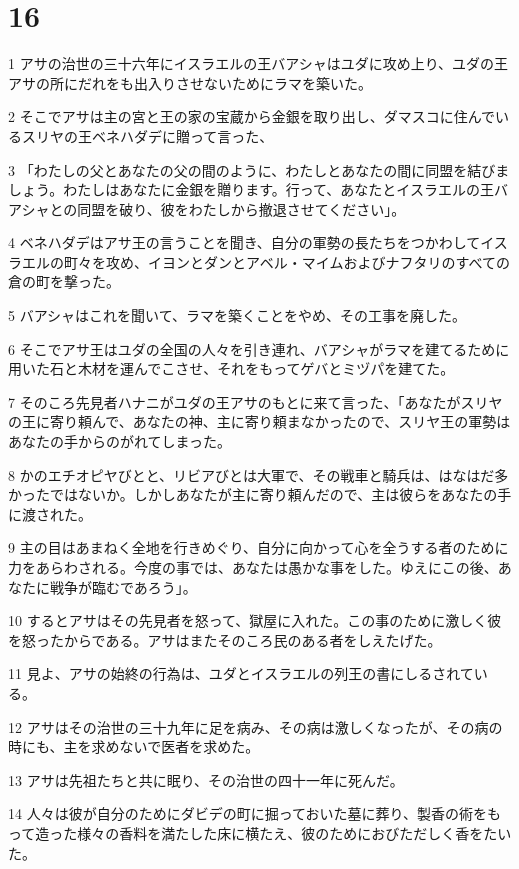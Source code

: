 \chapter{16}

\par 1 アサの治世の三十六年にイスラエルの王バアシャはユダに攻め上り、ユダの王アサの所にだれをも出入りさせないためにラマを築いた。
\par 2 そこでアサは主の宮と王の家の宝蔵から金銀を取り出し、ダマスコに住んでいるスリヤの王ベネハダデに贈って言った、
\par 3 「わたしの父とあなたの父の間のように、わたしとあなたの間に同盟を結びましょう。わたしはあなたに金銀を贈ります。行って、あなたとイスラエルの王バアシャとの同盟を破り、彼をわたしから撤退させてください」。
\par 4 ベネハダデはアサ王の言うことを聞き、自分の軍勢の長たちをつかわしてイスラエルの町々を攻め、イヨンとダンとアベル・マイムおよびナフタリのすべての倉の町を撃った。
\par 5 バアシャはこれを聞いて、ラマを築くことをやめ、その工事を廃した。
\par 6 そこでアサ王はユダの全国の人々を引き連れ、バアシャがラマを建てるために用いた石と木材を運んでこさせ、それをもってゲバとミヅパを建てた。
\par 7 そのころ先見者ハナニがユダの王アサのもとに来て言った、「あなたがスリヤの王に寄り頼んで、あなたの神、主に寄り頼まなかったので、スリヤ王の軍勢はあなたの手からのがれてしまった。
\par 8 かのエチオピヤびとと、リビアびとは大軍で、その戦車と騎兵は、はなはだ多かったではないか。しかしあなたが主に寄り頼んだので、主は彼らをあなたの手に渡された。
\par 9 主の目はあまねく全地を行きめぐり、自分に向かって心を全うする者のために力をあらわされる。今度の事では、あなたは愚かな事をした。ゆえにこの後、あなたに戦争が臨むであろう」。
\par 10 するとアサはその先見者を怒って、獄屋に入れた。この事のために激しく彼を怒ったからである。アサはまたそのころ民のある者をしえたげた。
\par 11 見よ、アサの始終の行為は、ユダとイスラエルの列王の書にしるされている。
\par 12 アサはその治世の三十九年に足を病み、その病は激しくなったが、その病の時にも、主を求めないで医者を求めた。
\par 13 アサは先祖たちと共に眠り、その治世の四十一年に死んだ。
\par 14 人々は彼が自分のためにダビデの町に掘っておいた墓に葬り、製香の術をもって造った様々の香料を満たした床に横たえ、彼のためにおびただしく香をたいた。

